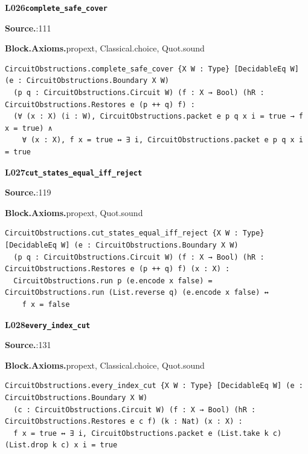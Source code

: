 \par\medskip\noindent\begin{minipage}{\textwidth}
{\small\bfseries L026\enspace\texttt{complete\_safe\_cover}\par}
{\footnotesize\raggedright\textbf{Source.}\enspace{}:111\par
\textbf{Block.}\quad\textbf{Axioms.}\enspace propext, Classical.choice, Quot.sound\par}\nopagebreak
\begin{lstlisting}
CircuitObstructions.complete_safe_cover {X W : Type} [DecidableEq W] (e : CircuitObstructions.Boundary X W)
  (p q : CircuitObstructions.Circuit W) (f : X → Bool) (hR : CircuitObstructions.Restores e (p ++ q) f) :
  (∀ (x : X) (i : W), CircuitObstructions.packet e p q x i = true → f x = true) ∧
    ∀ (x : X), f x = true ↔ ∃ i, CircuitObstructions.packet e p q x i = true
\end{lstlisting}
\end{minipage}\par

\par\medskip\noindent\begin{minipage}{\textwidth}
{\small\bfseries L027\enspace\texttt{cut\_states\_equal\_iff\_reject}\par}
{\footnotesize\raggedright\textbf{Source.}\enspace{}:119\par
\textbf{Block.}\quad\textbf{Axioms.}\enspace propext, Quot.sound\par}\nopagebreak
\begin{lstlisting}
CircuitObstructions.cut_states_equal_iff_reject {X W : Type} [DecidableEq W] (e : CircuitObstructions.Boundary X W)
  (p q : CircuitObstructions.Circuit W) (f : X → Bool) (hR : CircuitObstructions.Restores e (p ++ q) f) (x : X) :
  CircuitObstructions.run p (e.encode x false) = CircuitObstructions.run (List.reverse q) (e.encode x false) ↔
    f x = false
\end{lstlisting}
\end{minipage}\par

\par\medskip\noindent\begin{minipage}{\textwidth}
{\small\bfseries L028\enspace\texttt{every\_index\_cut}\par}
{\footnotesize\raggedright\textbf{Source.}\enspace{}:131\par
\textbf{Block.}\quad\textbf{Axioms.}\enspace propext, Classical.choice, Quot.sound\par}\nopagebreak
\begin{lstlisting}
CircuitObstructions.every_index_cut {X W : Type} [DecidableEq W] (e : CircuitObstructions.Boundary X W)
  (c : CircuitObstructions.Circuit W) (f : X → Bool) (hR : CircuitObstructions.Restores e c f) (k : Nat) (x : X) :
  f x = true ↔ ∃ i, CircuitObstructions.packet e (List.take k c) (List.drop k c) x i = true
\end{lstlisting}
\end{minipage}\par

